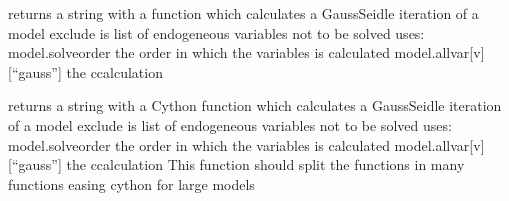 \documentclass[letterpaper,10pt,english]{sphinxmanual}
\begin{document}
\begin{fulllineitems}
\begin{fulllineitems}
\end{fulllineitems}


\begin{fulllineitems}
\label{\detokenize{unsorted/modelclass2:modelclass2.simmodel.outsolve3}}
\pysigstartsignatures
{}
\pysigstopsignatures
\sphinxAtStartPar
returns a string with a function which calculates a
Gauss\sphinxhyphen{}Seidle iteration of a model
exclude is list of endogeneous variables not to be solved
uses:
model.solveorder the order in which the variables is calculated
model.allvar{[}v{]}{[}“gauss”{]} the ccalculation

\end{fulllineitems}


\begin{fulllineitems}
\label{\detokenize{unsorted/modelclass2:modelclass2.simmodel.cytsolve}}
\pysigstartsignatures
{}
\pysigstopsignatures
\sphinxAtStartPar
returns a string with a Cython function which calculates a
Gauss\sphinxhyphen{}Seidle iteration of a model
exclude is list of endogeneous variables not to be solved
uses:
model.solveorder the order in which the variables is calculated
model.allvar{[}v{]}{[}“gauss”{]} the ccalculation
This function should split the functions in many functions easing cython for large models

\end{fulllineitems}


\end{fulllineitems}
\end{document}
